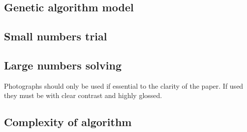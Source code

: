 \documentclass[a4paper]{article}
\begin{document}
\subsection{Genetic algorithm model}



\subsection{Small numbers trial}


\subsection{Large numbers solving}





Photographs should only be used if essential to the clarity of the paper.  If used they must be with clear contrast and highly glossed.

\subsection{Complexity of algorithm}
\end{document}
